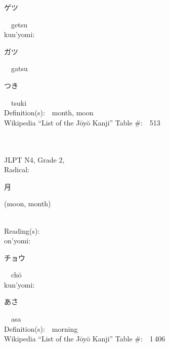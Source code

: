 \begin{multicols}{2}
{\hspace*{2em}}{\begin{CJK}{UTF8}{min} ゲツ \end{CJK}}\ \ getsu\ \ \\
{\hspace*{1em}}kun'yomi:\ \ \\
{\hspace*{2em}}{\begin{CJK}{UTF8}{min} ガツ \end{CJK}}\ \ gatsu\ \ \\
{\hspace*{2em}}{\begin{CJK}{UTF8}{min} つき \end{CJK}}\ \ tsuki\ \ \\
Definition(s):\ \ month, moon \\
Wikipedia ``List of the J\=oy\=o Kanji'' Table \#:\ \ 513 \\
\ \ \\
{\fontsize{34pt}{40pt}  }\ \ \\  %
{JLPT N4, Grade 2, \\Radical:\ \ {\begin{CJK}{UTF8}{min} 月 \end{CJK}} (moon, month) } \\
Reading(s):\ \ \\
{\hspace*{1em}}on'yomi:\ \ \\
{\hspace*{2em}}{\begin{CJK}{UTF8}{min} チョウ \end{CJK}}\ \ ch\=o\ \ \\
{\hspace*{1em}}kun'yomi:\ \ \\
{\hspace*{2em}}{\begin{CJK}{UTF8}{min} あさ \end{CJK}}\ \ asa\ \ \\
Definition(s):\ \ morning \\
Wikipedia ``List of the J\=oy\=o Kanji'' Table \#:\ \ 1\,406 \\
\ \ \\
{\fontsize{34pt}{40pt}  }\ \ \\  %

\end{multicols}

